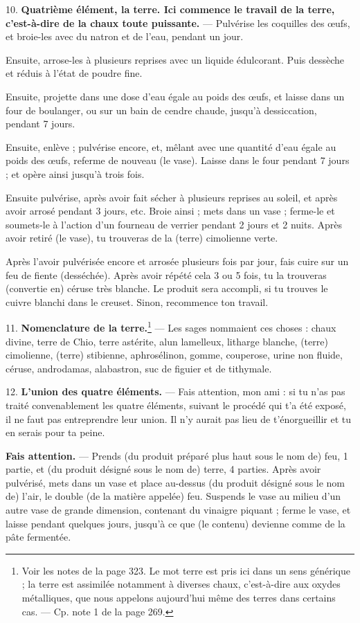 \documentclass[a4paper, 11pt, oneside, polutonikogreek, french]{article}
\begin{document}
10. \textbf{Quatrième élément, la terre. Ici commence le travail de la terre, c'est-à-dire de la chaux toute puissante.} --- Pulvérise les coquilles des œufs, et broie-les avec du natron et de l'eau, pendant un jour.

Ensuite, arrose-les à plusieurs reprises avec un liquide édulcorant. Puis dessèche et réduis à l'état de poudre fine.

Ensuite, projette dans une dose d'eau égale au poids des œufs, et laisse dans un four de boulanger, ou sur un bain de cendre chaude, jusqu'à dessiccation, pendant 7 jours.

Ensuite, enlève ; pulvérise encore, et, mêlant avec une quantité d'eau égale au poids des œufs, referme de nouveau (le vase). Laisse dans le four pendant 7 jours ; et opère ainsi jusqu'à trois fois.

Ensuite pulvérise, après avoir fait sécher à plusieurs reprises au soleil, et après avoir arrosé pendant 3 jours, etc. Broie ainsi ; mets dans un vase ; ferme-le et soumets-le à l'action d'un fourneau de verrier pendant 2 jours et 2 nuits. Après avoir retiré (le vase), tu trouveras de la (terre) cimolienne verte.

Après l'avoir pulvérisée encore et arrosée plusieurs fois par jour, fais cuire sur un feu de fiente (desséchée). Après avoir répété cela 3 ou 5 fois, tu la trouveras (convertie en) céruse très blanche. Le produit sera accompli, si tu trouves le cuivre blanchi dans le creuset. Sinon, recommence ton travail.

11. \textbf{Nomenclature de la terre.}\footnote{Voir les notes de la page 323. Le mot terre est pris ici dans un sens générique ; la terre est assimilée notamment à diverses chaux, c'est-à-dire aux oxydes métalliques, que nous appelons aujourd'hui même des terres dans certains cas. --- Cp. note 1 de la page 269.} --- Les sages nommaient ces choses : chaux divine, terre de Chio, terre astérite, alun lamelleux, litharge blanche, (terre) cimolienne, (terre) stibienne, aphrosélinon, gomme, couperose, urine non fluide, céruse, androdamas, alabastron, suc de figuier et de tithymale.

12. \textbf{L'union des quatre éléments.} --- Fais attention, mon ami : si tu n'as pas traité convenablement les quatre éléments, suivant le procédé qui t'a été exposé, il ne faut pas entreprendre leur union. Il n'y aurait pas lieu de t'énorgueillir et tu en serais pour ta peine.

\textbf{Fais attention.} --- Prends (du produit préparé plus haut sous le nom de) feu, 1 partie, et (du produit désigné sous le nom de) terre, 4 parties. Après avoir pulvérisé, mets dans un vase et place au-dessus (du produit désigné sous le nom de) l'air, le double (de la matière appelée) feu. Suspends le vase au milieu d'un autre vase de grande dimension, contenant du vinaigre piquant ; ferme le vase, et laisse pendant quelques jours, jusqu'à ce que (le contenu) devienne comme de la pâte fermentée.
\end{document}
